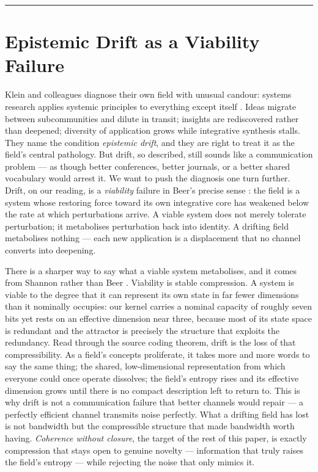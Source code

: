 \documentclass[12pt]{article}
\begin{document}
\bigskip
\hrule
\bigskip

\section{Epistemic Drift as a Viability Failure}
\label{sec:drift}


Klein and colleagues diagnose their own field with unusual candour: systems
research applies systemic principles to everything except itself
\citep{Klein2025}. Ideas migrate between subcommunities and dilute in transit;
insights are rediscovered rather than deepened; diversity of application grows
while integrative synthesis stalls. They name the condition \emph{epistemic
drift}, and they are right to treat it as the field's central pathology. But
drift, so described, still sounds like a communication problem --- as though
better conferences, better journals, or a better shared vocabulary would arrest
it. We want to push the diagnosis one turn further. Drift, on our reading, is a
\emph{viability} failure in Beer's precise sense \citep{Beer1972,Beer1979}: the field is a system whose
restoring force toward its own integrative core has weakened below the rate at
which perturbations arrive. A viable system does not merely tolerate
perturbation; it metabolises perturbation back into identity. A drifting field
metabolises nothing --- each new application is a displacement that no channel
converts into deepening.

There is a sharper way to say what a viable system metabolises, and it comes
from Shannon rather than Beer \citep{Shannon1948}. Viability is stable
compression. A system is viable to the degree that it can represent its own
state in far fewer dimensions than it nominally occupies: our kernel carries a
nominal capacity of roughly seven bits yet rests on an effective dimension near
three, because most of its state space is redundant and the attractor is
precisely the structure that exploits the redundancy. Read through the source
coding theorem, drift is the loss of that compressibility. As a field's concepts
proliferate, it takes more and more words to say the same thing; the shared,
low-dimensional representation from which everyone could once operate dissolves;
the field's entropy rises and its effective dimension grows until there is no
compact description left to return to. This is why drift is not a communication
failure that better channels would repair --- a perfectly efficient channel
transmits noise perfectly. What a drifting field has lost is not bandwidth but
the compressible structure that made bandwidth worth having. \emph{Coherence
without closure}, the target of the rest of this paper, is exactly compression
that stays open to genuine novelty --- information that truly raises the field's
entropy --- while rejecting the noise that only mimics it.
\end{document}
